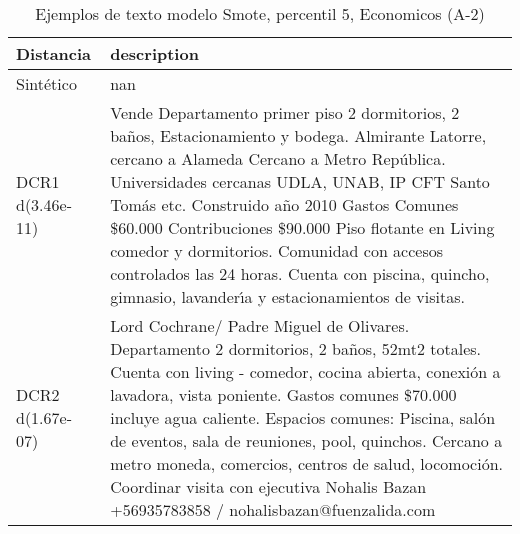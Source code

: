 \begin{table}[H]
\centering
\fontsize{10}{14}\selectfont
\caption{Ejemplos de texto modelo Smote, percentil 5, Economicos (A-2)}
\label{table-example-economicos-a-2-smote-enc-5p-text}
\begin{tabular}{|l|m{35em}|}
\hline
\rowcolor[gray]{0.8}
Distancia & description \\
\hline Sintético & nan \\
\hline DCR1 d(3.46e-11) & Vende Departamento primer piso 2 dormitorios, 2 ba\~nos, Estacionamiento y bodega. Almirante Latorre, cercano a Alameda Cercano a Metro Rep\'ublica. Universidades cercanas UDLA, UNAB, IP CFT Santo Tom\'as etc. Construido a\~no 2010 Gastos Comunes \$60.000 Contribuciones \$90.000 Piso flotante en Living comedor y dormitorios. Comunidad con accesos controlados las 24 horas. Cuenta con piscina, quincho, gimnasio, lavander{\'\i}a y estacionamientos de visitas. \\
\hline DCR2 d(1.67e-07) & Lord Cochrane/ Padre Miguel de Olivares. Departamento 2 dormitorios, 2 ba\~nos, 52mt2 totales. Cuenta con living - comedor, cocina abierta, conexi\'on a lavadora, vista poniente. Gastos comunes \$70.000 incluye agua caliente. Espacios comunes: Piscina, sal\'on de eventos, sala de reuniones, pool, quinchos. Cercano a metro moneda, comercios, centros de salud, locomoci\'on.  Coordinar visita con ejecutiva Nohalis Bazan +56935783858 / nohalisbazan@fuenzalida.com \\
\hline
\end{tabular}
\end{table}

